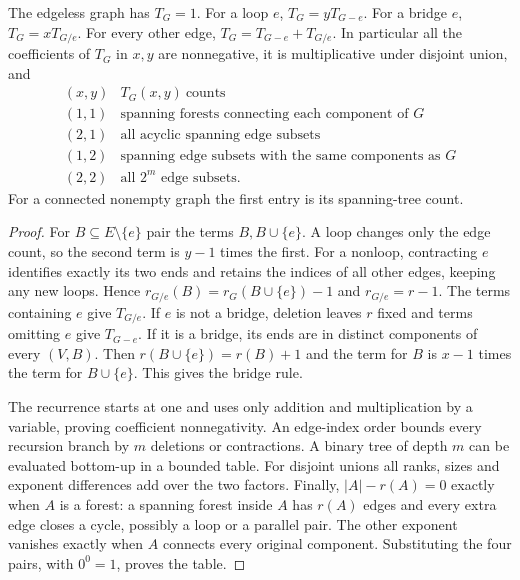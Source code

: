 \begin{theorem}\leavevmode\label{fl:tutterec}
The edgeless graph has $T_G=1$. For a loop $e$, $T_G=yT_{G-e}$.
For a bridge $e$, $T_G=xT_{G/e}$. For every other edge,
$T_G=T_{G-e}+T_{G/e}$. In particular all the coefficients of $T_G$ in
$x,y$ are nonnegative, it is multiplicative under disjoint union, and
\[
\begin{array}{c|l}
 (x,y)&T_G(x,y)\ \text{counts}\\ \hline
 (1,1)&\text{spanning forests connecting each component of }G\\
 (2,1)&\text{all acyclic spanning edge subsets}\\
 (1,2)&\text{spanning edge subsets with the same components as }G\\
 (2,2)&\text{all }2^m\text{ edge subsets}.
\end{array}
\]
For a connected nonempty graph the first entry is its spanning-tree count.
\end{theorem}
\begin{proof}
For $B\subseteq E\setminus\{e\}$ pair the terms $B,B\cup\{e\}$.
A loop changes only the edge count, so the second term is $y-1$
times the first. For a nonloop, contracting $e$ identifies exactly
its two ends and retains the indices of all other edges, keeping any
new loops. Hence $r_{G/e}(B)=r_G(B\cup\{e\})-1$ and
$r_{G/e}=r-1$. The terms containing $e$ give $T_{G/e}$. If $e$ is
not a bridge, deletion leaves $r$ fixed and terms omitting $e$ give
$T_{G-e}$. If it is a bridge, its ends are in distinct components of
every $(V,B)$. Then $r(B\cup\{e\})=r(B)+1$ and the term for $B$ is
$x-1$ times the term for $B\cup\{e\}$. This gives the bridge rule.

The recurrence starts at one and uses only addition and multiplication
by a variable, proving coefficient nonnegativity. An edge-index order
bounds every recursion branch by $m$ deletions or contractions. A binary
tree of depth $m$ can be evaluated bottom-up in a bounded table.
For disjoint unions all ranks, sizes and exponent differences add
over the two factors. Finally, $|A|-r(A)=0$ exactly when $A$ is a
forest: a spanning forest inside $A$ has $r(A)$ edges and every extra
edge closes a cycle, possibly a loop or a parallel pair. The other
exponent vanishes exactly when $A$ connects every original component.
Substituting the four pairs, with $0^0=1$, proves the table.
\end{proof}

